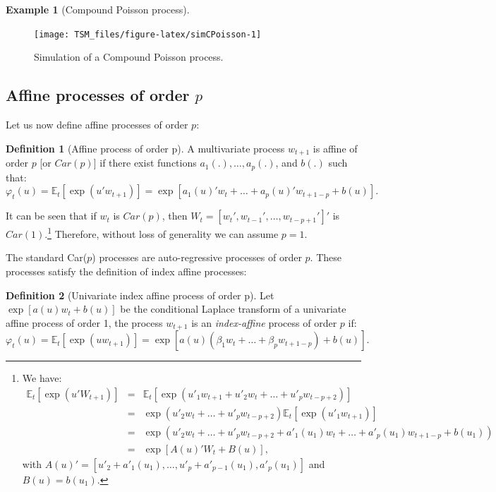 \documentclass[
  12pt,
]{book}
\theoremstyle{definition}
\newtheorem{definition}{Definition}[chapter]
\theoremstyle{definition}
\newtheorem{example}{Example}[chapter]
\theoremstyle{definition}
\theoremstyle{definition}
\theoremstyle{remark}
\begin{document}
\begin{example}[Compound Poisson process]
\begin{figure}
\texttt{[image: TSM\_files/figure-latex/simCPoisson-1]} \caption{Simulation of a Compound Poisson process.}\label{fig:simCPoisson}
\end{figure}

\end{example}

\hypertarget{SubCarp}{%
\subsection{\texorpdfstring{Affine processes of order \(p\)}{Affine processes of order p}}\label{SubCarp}}

Let us now define affine processes of order \(p\):

\begin{definition}[Affine process of order p]
\protect\hypertarget{def:Carp}{}\label{def:Carp}A multivariate process \(w_{t+1}\) is affine of order \(p\) {[}or \(Car(p)\){]} if there exist functions \(a_1(.),\dots,a_p(.)\), and \(b(.)\) such that:
\[
\varphi_t(u)=\mathbb{E}_t[\exp(u' w_{t+1})]=\exp[a_1(u)'w_t+\dots+a_p(u)'w_{t+1-p}+b(u)].
\]
\end{definition}

It can be seen that if \(w_t\) is \(Car(p)\), then \(W_t = [w_t', w_{t-1}',\dots,w_{t-p+1}']'\) is \(Car(1)\).\footnote{We have:
  \begin{eqnarray*}
  \mathbb{E}_t[\exp(u'W_{t+1})] &=& \mathbb{E}_t[\exp(u'_1 w_{t+1}+u'_2 w_t+\dots+u'_p w_{t-p+2})] \\
  &=& \exp(u'_2 w_t+\dots+u'_p w_{t-p+2})\mathbb{E}_t[\exp(u'_1 w_{t+1})] \\
  &=& \exp(u'_2 w_t+\dots+u'_p w_{t-p+2}+a'_1(u_1)
  w_t  +\dots+a'_p(u_1)w_{t+1-p}+b(u_1)) \\
  &=& \exp[A(u)'W_t+B(u)],
  \end{eqnarray*}
  with \(A(u)' = [u'_2+a'_1(u_1),\dots,u'_p+a'_{p-1}(u_1), a'_p(u_1)]\) and \(B(u) = b(u_1)\).} Therefore, without loss of generality we can assume \(p = 1\).

The standard Car(\(p\)) processes are auto-regressive processes of order \(p\). These processes satisfy the definition of index affine processes:

\begin{definition}[Univariate index affine process of order p]
Let \(\exp[a(u)w_t+b(u)]\) be the conditional Laplace transform of a univariate affine process of order 1, the process \(w_{t+1}\) is an \emph{index-affine} process of order \(p\) if:
\[
\varphi_t(u)=\mathbb{E}_t[\exp(u w_{t+1})]=\exp[a(u)(\beta_1 w_t+\dots+\beta_p
w_{t+1-p})+b(u)].
\]
\end{definition}
\end{document}
